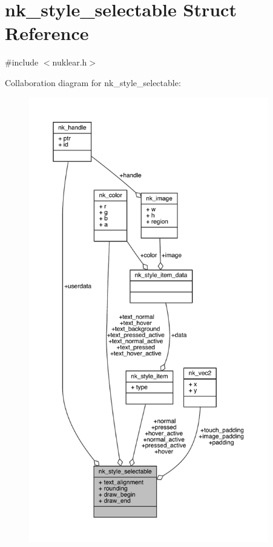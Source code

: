 \hypertarget{structnk__style__selectable}{}\section{nk\+\_\+style\+\_\+selectable Struct Reference}
\label{structnk__style__selectable}


{\ttfamily \#include $<$nuklear.\+h$>$}



Collaboration diagram for nk\+\_\+style\+\_\+selectable\+:
\nopagebreak
\begin{figure}[H]
\begin{center}
\leavevmode
\includegraphics[height=550pt]{structnk__style__selectable__coll__graph}
\end{center}
\end{figure}
